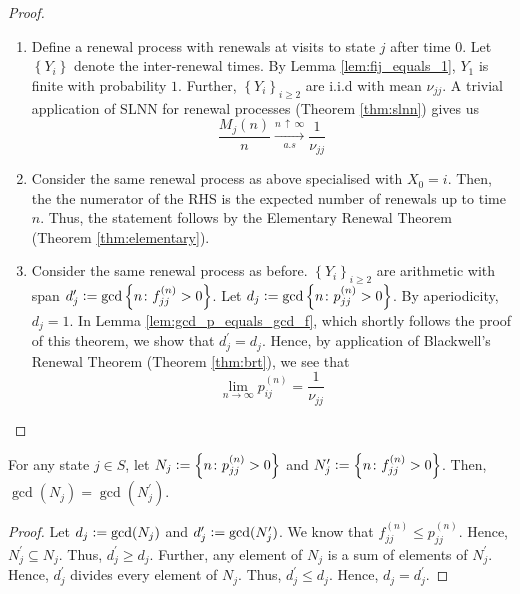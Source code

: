 \documentclass[12pt]{article}
\theoremstyle{definition}
\begin{document}
\begin{proof}
    \begin{enumerate}
        \item Define a renewal process with renewals at visits to state $j$ after time $0$. Let $\left\{ Y_i \right\}$ denote the inter-renewal times. By Lemma \ref{lem:fij_equals_1}, $Y_1$ is finite with probability $1$. Further, $\left\{ Y_i \right\}_{i \geq 2}$ are i.i.d with mean $\nu_{jj}$. A trivial application of SLNN for renewal processes (Theorem \ref{thm:slnn}) gives us
        \[
            \frac{M_j(n)}{n} \xrightarrow[a.s]{n \, \uparrow \, \infty} \frac{1}{\nu_{jj}}
        \]
        
        \item Consider the same renewal process as above specialised with $X_0 = i$. Then, the the numerator of the RHS is the expected number of renewals up to time $n$. Thus, the statement follows by the Elementary Renewal Theorem (Theorem \ref{thm:elementary}).
        
        \item Consider the same renewal process as before. $\left\{ Y_i \right\}_{i \geq 2}$ are arithmetic with span $d_j^{\prime} \vcentcolon= \gcd\left\{ n \colon f_{jj}^{(n)} > 0 \right\}$. Let $d_j \vcentcolon= \gcd\left\{ n \colon p_{jj}^{(n)} > 0 \right\}$. By aperiodicity, $d_j = 1$. In Lemma \ref{lem:gcd_p_equals_gcd_f}, which shortly follows the proof of this theorem, we show that $d_j^{\prime} = d_j$. Hence, by application of Blackwell's Renewal Theorem (Theorem \ref{thm:brt}), we see that
        \[
            \lim_{n \to \infty} p_{ij}^{(n)} = \frac{1}{\nu_{jj}}
        \]
    \end{enumerate}
\end{proof}

\begin{lem} \label{lem:gcd_p_equals_gcd_f}
    For any state $j \in S$, let $N_j \vcentcolon= \left\{ n \colon p_{jj}^{(n)} > 0 \right\}$ and $N_j^{\prime} \vcentcolon= \left\{ n \colon f_{jj}^{(n)} > 0 \right\}$. Then, $\gcd(N_j) = \gcd(N_j^{\prime})$. 
\end{lem}

\begin{proof}
    Let $d_j \vcentcolon= \gcd(N_j)$ and $d_j^{\prime} \vcentcolon= \gcd(N_j^{\prime})$. We know that $f_{jj}^{(n)} \leq p_{jj}^{(n)}$. Hence, $N_j^{\prime} \subseteq N_j$. Thus, $d_j^{\prime} \geq d_j$. Further, any element of $N_j$ is a sum of elements of $N_j^{\prime}$. Hence, $d_j^{\prime}$ divides every element of $N_j$. Thus, $d_j^{\prime} \leq d_j$. Hence, $d_j = d_j^{\prime}$.
\end{proof}
\end{document}
